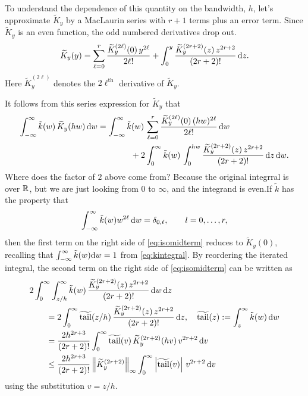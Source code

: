 \documentclass[letterpaper]{amsart}
\newcommand{\tKY}{\widetilde{K}_y}
\newcommand{\tk}{\tilde{k}}
\DeclareMathOperator{\ttk}{\widetilde{tail}}
\newcommand{\AGSNote}[1]{{\color{cyan} #1}}
\newcommand{\FJHNote}[1]{{\color{blue} #1}}
\begin{document}
To understand the dependence of this quantity on the bandwidth, $h$, let's approximate $\tKY$ by a MacLaurin series with $r+1$ terms plus an error term.  Since $\tKY$ is an even function, the odd numbered derivatives drop out.
\begin{equation*}
	\tKY(y)  = \sum_{\ell = 0}^{r} \frac{\tKY^{(2\ell)}(0) \, y^{2\ell}}{2\ell!} + \int_0^y \frac{\tKY^{(2r+2)}(z) \,  z^{2r+2}}{(2r+2)!} \, \dif z.
\end{equation*}
Here $\tKY^{(2\ell)}$ denotes the $2\ell^{\text{th}}$ derivative of $\tKY$.

It follows from this series expression for $\tKY$ that
\begin{align} \label{eq:isomidterm}
	\int_{-\infty}^{\infty} \tk(w) \, \tKY(hw) \, \dif w & =
	\int_{-\infty}^{\infty} \tk(w) \, \sum_{\ell = 0}^{r} \frac{\tKY^{(2\ell)}(0) \, (hw)^{2\ell}}{2\ell!}  \, \dif w \\
	&
	\nonumber
	\qquad \qquad
	+ 2 \int_{0}^{\infty} \tk(w) \,  \int_0^{hw} \frac{\tKY^{(2r+2)}(z) \,  z^{2r+2}}{(2r+2)!} \, \dif z  \, \dif w.
\end{align}
\AGSNote{Where does the factor of $2$ above come from?} \FJHNote{Because the original integrral is over $\mathbb{R}$, but we are just looking from $0$ to $\infty$, and the integrand is even.}If $\tk$ has the property that
\begin{equation} \label{eq:tkprop}
	\int_{-\infty}^{\infty} \tk(w) w^{2\ell}  \, \dif w =  \delta_{0,\ell}, \qquad l=0,\dots,r,
\end{equation}
then the first term on the right side of \eqref{eq:isomidterm} reduces to $\tKY(0)$, recalling that $\int_{-\infty}^\infty \tilde{k}(w) {\rm d} w = 1$ from \eqref{eq:kintegral}.   By reordering the iterated integral, the  second term on the right side of  \eqref{eq:isomidterm} can be written as
\begin{align*}
	\MoveEqLeft{2 \int_{0}^{\infty}  \int_{z/h}^\infty \tk(w) \, \frac{\tKY^{(2r+2)}(z) \,  z^{2r+2}}{(2r+2)!}   \, \dif w \, \dif z} \\
	& =  2\int_{0}^{\infty}  \ttk(z/h) \, \frac{\tKY^{(2r+2)}(z) \,  z^{2r+2}}{(2r+2)!}    \, \dif z,
	\quad \ttk(z) := \int_{z}^\infty \tk(w) \, \dif w \\
	& =  \frac{2h^{2r+3}}{(2r+2)!} \int_{0}^{\infty}  \ttk(v) \, \tKY^{(2r+2)}(hv) \,  v^{2r+2}    \, \dif v \\
	&  \le  \frac{2h^{2r+3}}{(2r+2)!}  \norm[\infty]{\tKY^{(2r+2)}} \int_{0}^{\infty}  \abs{\ttk(v)}  \,  v^{2r+2}    \, \dif v \\
\end{align*}
using the substitution $v = z/h$.
\end{document}
